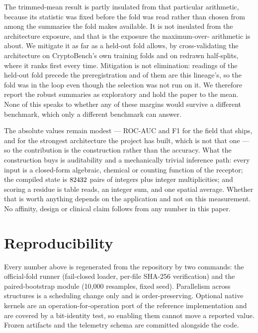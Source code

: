 \documentclass[11pt]{article}
\begin{document}
The trimmed-mean result is partly insulated from that particular arithmetic,
because its statistic was fixed before the fold was read rather than chosen from
among the summaries the fold makes available. It is not insulated from the
architecture exposure, and that is the exposure the maximum-over-\NArchOnFold{}
arithmetic is about. We mitigate it as far as a held-out fold allows, by
cross-validating the architecture on CryptoBench's own \NSplitsCv{} training
folds and on \NSplitsRh{} redrawn half-splits, where it ranks first every time.
Mitigation is not elimination: \EndReadsBefore{} readings of the held-out fold
precede the preregistration and \EndLineageBefore{} of them are this lineage's,
so the fold was in the loop even though the selection was not run on it. We
therefore report the robust summaries as exploratory and hold the paper to the
mean. None of this speaks to whether any of these margins would survive a
different benchmark, which only a different benchmark can answer.

The absolute values remain modest --- ROC-AUC \TabAuc{} and F1 \TabFOne{} for
the field that ships, and \GrandBestRoc{} for the strongest architecture the
project has built, which is not that one --- so the contribution is the
construction rather than the accuracy. What the construction buys is
auditability and a mechanically
trivial inference path: every input is a closed-form algebraic, chemical or
counting function of the receptor; the compiled state is
\(82432{}\) pairs of integers plus \NTabTables{} integer multiplicities;
and scoring a residue is \NTabTables{} table reads, an integer sum, and one
spatial average. Whether that is worth anything depends on the application and
not on this measurement. No affinity, design or clinical claim follows from any
number in this paper.

\section{Reproducibility}
Every number above is regenerated from the repository by two commands: the
official-fold runner (fail-closed loader, per-file SHA-256 verification) and the
paired-bootstrap module (10{,}000 resamples, fixed seed). Parallelism across
structures is a scheduling change only and is order-preserving. Optional native
kernels are an operation-for-operation port of the reference implementation and
are covered by a bit-identity test, so enabling them cannot move a reported
value. Frozen artifacts and the telemetry schema are committed alongside the
code.
\end{document}
